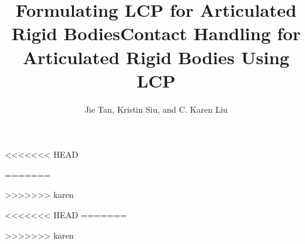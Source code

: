 \documentclass[12pt, letterpaper, onecolumn]{article}
\begin{document}
<<<<<<< HEAD
\title{Formulating LCP for Articulated Rigid Bodies}
\author{}
=======
\title{Contact Handling for Articulated Rigid Bodies Using LCP}
\author{Jie Tan, Kristin Siu, and C. Karen Liu}
>>>>>>> karen
\date{}

\maketitle




<<<<<<< HEAD
=======



>>>>>>> karen
\end{document}

